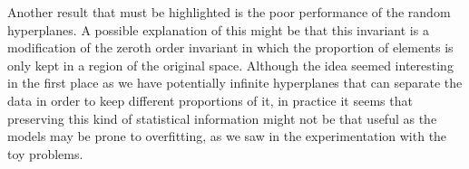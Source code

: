 Another result that must be highlighted is the poor performance of the random hyperplanes. A possible
explanation of this might be that this invariant is a modification of the zeroth order invariant in
which the proportion of elements is only kept in a region of the original space. Although the idea seemed
interesting in the first place as we have potentially infinite hyperplanes that can separate the data in order
to keep different proportions of it, in practice it seems that preserving this kind of statistical information
might not be that useful as the models may be prone to overfitting, as we saw in the experimentation with the toy
problems.

\begin{table}[h]
\centering
{}
\end{table}
